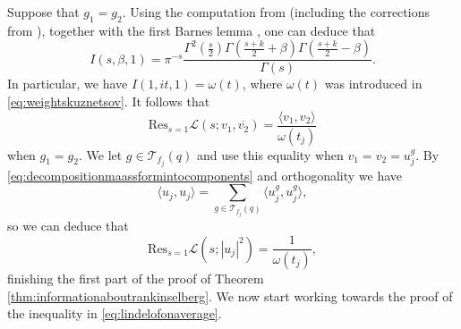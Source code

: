 \documentclass{article}
\theoremstyle{named}
\renewcommand{\L}{\mathcal{L}}
\newcommand{\T}{\mathcal{T}}
\begin{document}
Suppose that $g_1 = g_2$. Using the computation from \cite[Lemma 8.2]{DFIsubconvexityartin} (including the corrections from \cite[Section 12]{youngeisensteinseries}), together with the first Barnes lemma \cite[\href{https://dlmf.nist.gov/5.13.E3}{(5.13.3)}]{dlmf}, one can deduce that 
\begin{equation}\label{eq:archimedeanrankinselbergexplicitformula}
    I(s, \beta, 1) = \pi^{-s}\frac{\Gamma^2\left(\frac{s}{2}\right)\Gamma\left(\frac{s + k}{2} + \beta\right)\Gamma\left(\frac{s + k}{2} - \beta\right)}{\Gamma(s)}.
\end{equation}
In particular, we have $I(1, it, 1) = \omega(t)$, where $\omega(t)$ was introduced in \eqref{eq:weightskuznetsov}. It follows that
\begin{equation}\label{eq:residuenaiverankinselbergproductlseries}
    \text{Res}_{s = 1}\L(s; v_1, \overline{v_2}) = \frac{\langle v_1, v_2 \rangle}{\omega(t_j)}
\end{equation}
when $g_1 = g_2$. We let $g \in \T_{f_j}(q)$ and use this equality when $v_1 = v_2 = u_j^g$. By \eqref{eq:decompositionmaassformintocomponents} and orthogonality we have 
\begin{equation*}
    \langle u_j, u_j \rangle  = \sum_{g \in \T_{f_j}(q)} \langle u_j^{g}, u_j^g \rangle,
\end{equation*}
so we can deduce that
\begin{equation}\label{eq:computationresiduerankinselberg}
    \text{Res}_{s = 1}\L(s; |u_j|^2) = \frac{1}{\omega(t_j)},
\end{equation}
finishing the first part of the proof of Theorem \ref{thm:informationaboutrankinselberg}. We now start working towards the proof of the inequality in \eqref{eq:lindelofonaverage}.
\end{document}
